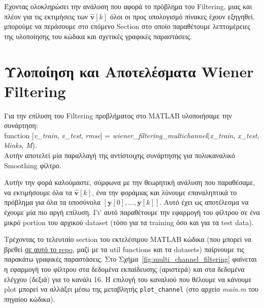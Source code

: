 \documentclass[12pt]{article} %
\begin{document}
\vspace{+10pt}

Έχοντας ολοκληρώσει την ανάλυση που αφορά το πρόβλημα του Filtering, μιας και πλέον για τις εκτιμήσεις των $\hat{\mathbf{v}}[k]$ όλοι οι προς υπολογισμό πίνακες έχουν εξηγηθεί, μπορούμε να περάσουμε στο επόμενο Section στο οποίο παραθέτουμε λεπτομέρειες της υλοποίησης του κώδικα και σχετικές γραφικές παραστάσεις.

\section*{Υλοποίηση και Αποτελέσματα Wiener Filtering}

Για την επίλυση του Filtering προβλήματος στο MATLAB υλοποιήσαμε την συνάρτηση: \\
function [\textit{v\_train}, \textit{v\_test}, \textit{rmse}] = \textit{wiener\_filtering\_multichannel}(\textit{x\_train}, \textit{x\_test}, \textit{blinks}, \textit{M}). \\
Αυτήν αποτελεί μία παραλλαγή της αντίστοιχης συνάρτησης για πολυκαναλικό Smoothing φίλτρο. 


Αυτήν την φορά καλούμαστε, σύμφωνα με την θεωρητική ανάλυση που παραθέσαμε, να εκτιμήσουμε όλα τα $\hat{\mathbf{v}}[k]$, ένα την φορά\textemdash μιας και λύνουμε επαναληπτικά το πρόβλημα για όλα τα υποσύνολα $[\mathbf{y}[0], \ldots, \mathbf{y}[k]]$. Αυτό έχει ως αποτέλεσμα να έχουμε μία πιο αργή επίλυση. Γι' αυτό παραθέτουμε την εφαρμογή του φίλτρου σε ένα μικρό portion του αρχικού dataset (τόσο για τα training όσο και για τα test data). 



Τρέχοντας το τελευταίο section του εκτελέσιμου MATLAB κώδικα (που μπορεί να βρεθεί \href{https://github.com/georrous6/Estimation-and-Detection-Theory/tree/main/PartB/src}{σε αυτό το repo}, μαζί με τα util functions και τα datasets) παίρνουμε τις παρακάτω γραφικές παραστάσεις. 
Στο Σχήμα~\ref{fig:multi_channel_filtering} φαίνεται η εφαρμογή του φίλτρου στα δεδομένα εκπαίδευσης 
(αριστερά) και στα δεδομένα ελέγχου (δεξιά) για το κανάλι 16. 
Η επιλογή του καναλιού που θέλουμε να κάνουμε plot μπορεί να αλλάξει μέσω της μεταβλητής \texttt{plot\_channel}
(στο αρχείο \textit{main.m} του πηγαίου κώδικα). 
\end{document}
